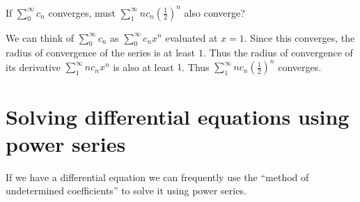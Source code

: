 \documentclass{ximera}
\begin{document}
\begin{question}
	If $\sum_0^\infty c_n$ converges, must $\sum_1^\infty nc_n(\frac{1}{2})^n$ also converge?
	
	\begin{multipleChoice}
	\end{multipleChoice}
	
	\begin{hint}
		We can think of $\sum_0^\infty c_n$ as $\sum_0^\infty c_n x^n$ evaluated at $x=1$.  Since this converges, the radius of convergence of the series is at least $1$.  Thus the radius of convergence of its derivative $\sum_1^\infty nc_n x^n$ is also at least $1$.  Thus $\sum_1^\infty nc_n(\frac{1}{2})^n$ converges.
	\end{hint}
\end{question}


\section{Solving differential equations using power series}

If we have a differential equation we can frequently use the ``method of undetermined coefficients'' to solve it using power series.
\end{document}
